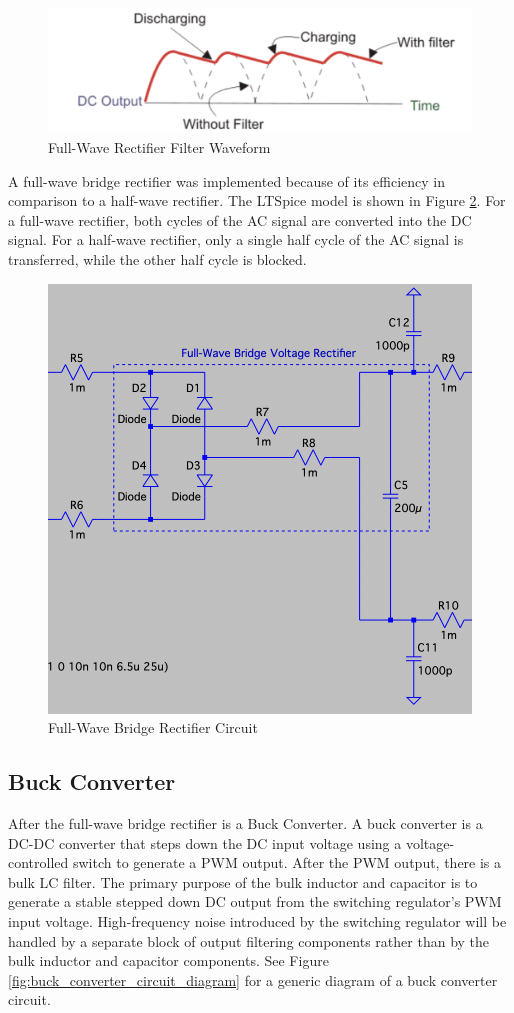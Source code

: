 \documentclass[conference]{IEEEtran}
\begin{document}
\begin{figure}[h]
    \centering
    \includegraphics[width=1.0\linewidth]{full-wave_bridge_rectifier_filter_waveform.png}
    \caption{Full-Wave Rectifier Filter Waveform}
    \label{fig:full-wave_bridge_rectifier_filter_waveform_diagram}
\end{figure}


A full-wave bridge rectifier was implemented because of its efficiency in comparison to a half-wave rectifier. The LTSpice model is shown in Figure \ref{fig:full-wave_bridge_rectifier_circuit_diagram}. For a full-wave rectifier, both cycles of the AC signal are converted into the DC signal. For a half-wave rectifier, only a single half cycle of the AC signal is transferred, while the other half cycle is blocked. 

\begin{figure}[hbp]
    \centering
    \includegraphics[width=0.5\linewidth]{full-wave_bridge_rectifier_circuit.png}
    \caption{Full-Wave Bridge Rectifier Circuit}
    \label{fig:full-wave_bridge_rectifier_circuit_diagram}
\end{figure}

\subsection{Buck Converter}
After the full-wave bridge rectifier is a Buck Converter. A buck converter is a DC-DC converter that steps down the DC input voltage using a voltage-controlled switch to generate a PWM output. After the PWM output, there is a bulk LC filter. The primary purpose of the bulk inductor and capacitor is to generate a stable stepped down DC output from the switching regulator's PWM input voltage. High-frequency noise introduced by the switching regulator will be handled by a separate block of output filtering components rather than by the bulk inductor and capacitor components. See Figure \ref{fig:buck_converter_circuit_diagram} for a generic diagram of a buck converter circuit.
\end{document}
